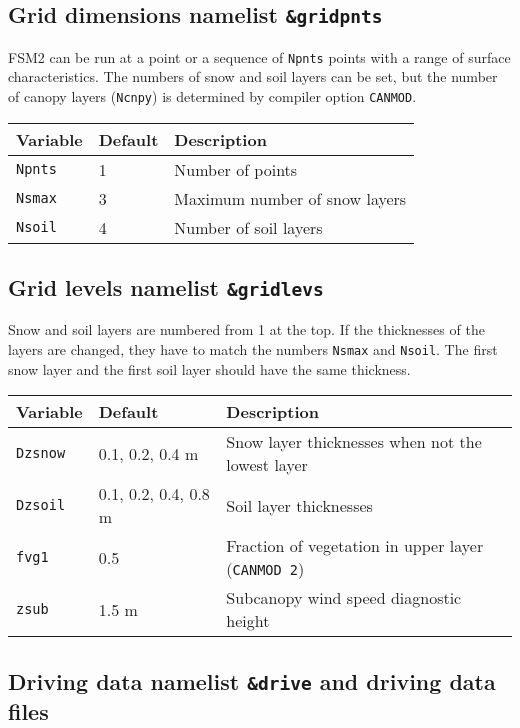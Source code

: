 \documentclass{article}
\begin{document}
\subsection{Grid dimensions namelist {\tt \&gridpnts}}
FSM2 can be run at a point or a sequence of {\tt Npnts} points with a range of surface characteristics. The numbers of snow and soil layers can be set, but the number of canopy layers ({\tt Ncnpy}) is determined by compiler option {\tt CANMOD}.

\begin{longtable}{|l|l|l|}
\hline
Variable & Default & Description \\ \hline
{\tt Npnts}      & 1    & Number of points               \\
{\tt Nsmax}      & 3    & Maximum number of snow layers  \\
{\tt Nsoil}      & 4    & Number of soil layers          \\ \hline
\end{longtable}

\subsection{Grid levels namelist {\tt \&gridlevs}}
Snow and soil layers are numbered from 1 at the top. If the thicknesses of the layers are changed, they have to match the numbers {\tt Nsmax} and {\tt Nsoil}. The first snow layer and the first soil layer should have the same thickness.

\begin{longtable}{|l|l|l|}
\hline
Variable & Default & Description \\ \hline
{\tt Dzsnow}      & 0.1, 0.2, 0.4 m       & Snow layer thicknesses when not the lowest layer       \\
{\tt Dzsoil}      & 0.1, 0.2, 0.4, 0.8 m  & Soil layer thicknesses                                 \\ 
{\tt fvg1}        & 0.5                   & Fraction of vegetation in upper layer ({\tt CANMOD 2}) \\
{\tt zsub}        & 1.5 m                 & Subcanopy wind speed diagnostic height                 \\ \hline
\end{longtable}

\subsection{Driving data namelist {\tt \&drive} and driving data files}
\end{document}
